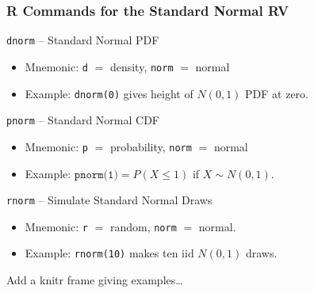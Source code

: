 \begin{frame}
  \frametitle{R Commands for the Standard Normal RV}
  \begin{block}{\texttt{dnorm} -- \small Standard Normal PDF}
    \begin{itemize}
      \item Mnemonic: \texttt{d} $=$ density, \texttt{norm} $=$ normal
      \item Example: \texttt{dnorm(0)} gives height of $N(0,1)$ PDF at zero.
    \end{itemize}
  \end{block}
  \pause
  \begin{block}{\texttt{pnorm} -- \small Standard Normal CDF}
    \begin{itemize}
      \item Mnemonic: \texttt{p} $=$ probability, \texttt{norm} $=$ normal
      \item Example: $\texttt{pnorm(1)} = P(X\leq 1)$ if $X\sim N(0,1)$.
    \end{itemize}
  \end{block}
  \pause
  \begin{block}{\texttt{rnorm} -- \small Simulate Standard Normal Draws}
    \begin{itemize}
      \item Mnemonic: \texttt{r} $=$ random, \texttt{norm} $=$ normal. 
      \item Example: \texttt{rnorm(10)} makes ten iid $N(0,1)$ draws.
    \end{itemize}
  \end{block}
\end{frame}
\begin{frame}
Add a knitr frame giving examples\dots
\end{frame}
